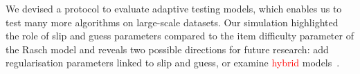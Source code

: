 \documentclass{sig-alternate}
\newcommand\alert[1]{\textcolor{red}{#1}}
\begin{document}



We devised a protocol to evaluate adaptive testing models, which enables us to test many more algorithms on large-scale datasets. Our simulation highlighted the role of slip and guess parameters compared to the item difficulty parameter of the Rasch model and reveals two possible directions for future research: add regularisation parameters linked to slip and guess, or examine \alert{hybrid} models~\cite{McGlohen2008}.








\end{document}

